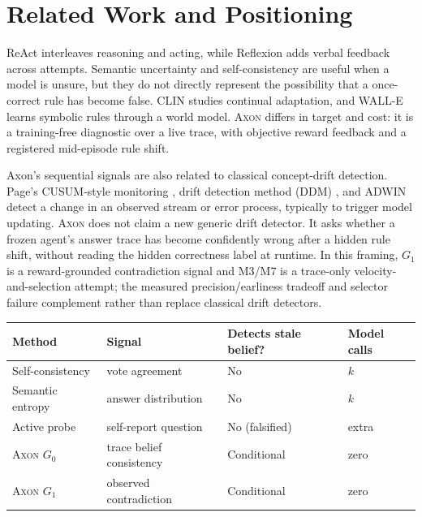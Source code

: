\documentclass[pdflatex,sn-basic]{sn-jnl}
\makeatletter
\theoremstyle{definition}
\newcommand{\axon}{\textsc{Axon}}
\def\tablebodyfont{\reset@font\fontsize{10.5bp}{12.5bp}\selectfont}
\renewenvironment{table}[1][]%
{\begin{tableorg}[#1]%
  \begin{center}%
  \begin{threeparttable}%
  \tablebodyfont%
  \setlength{\parskip}{0pt}%
  \renewcommand{\arraystretch}{1.20}%
  \renewcommand\footnotetext[2][]{{\removelastskip\vskip3pt%
    \let\tablebodyfont\tablefootnotefont%
    \hskip0pt\if!##1!\else{\smash{$^{##1}$}}\fi##2\par}}%
}{\end{threeparttable}\end{center}\end{tableorg}}
\makeatother
\begin{document}
\section{Related Work and Positioning}
\label{sec:related}

ReAct \citep{yao2023react} interleaves reasoning and acting, while Reflexion
\citep{shinn2023reflexion} adds verbal feedback across attempts. Semantic uncertainty and
self-consistency are useful when a model is unsure, but they do not directly represent the
possibility that a once-correct rule has become false. CLIN \citep{majumder2023clin} studies
continual adaptation, and WALL-E \citep{zhou2024walle} learns symbolic rules through a world
model. \axon{} differs in target and cost: it is a training-free diagnostic over a live trace,
with objective reward feedback and a registered mid-episode rule shift.

Axon's sequential signals are also related to classical concept-drift detection. Page's
CUSUM-style monitoring \citep{page1954}, drift detection method (DDM) \citep{gama2004}, and
ADWIN \citep{bifet2007} detect a change in an observed stream or error process, typically to
trigger model updating. \axon{} does not claim a new generic drift detector. It asks whether
a frozen agent's answer trace has become confidently wrong after a hidden rule shift, without
reading the hidden correctness label at runtime. In this framing, $G_1$ is a reward-grounded
contradiction signal and M3/M7 is a trace-only velocity-and-selection attempt; the measured
precision/earliness tradeoff and selector failure complement rather than replace classical
drift detectors.

\begin{table}[!ht]
\centering\footnotesize
\setlength{\tabcolsep}{3pt}
\begin{tabular}{p{24mm}p{30mm}p{39mm}p{15mm}}
\toprule
Method & Signal & Detects stale belief? & Model calls\\
\midrule
Self-consistency & vote agreement & No & $k$\\
Semantic entropy & answer distribution & No & $k$\\
Active probe & self-report question & No (falsified) & extra\\
\axon{} $G_0$ & trace belief consistency & Conditional & zero\\
\axon{} $G_1$ & observed contradiction & Conditional & zero\\
\bottomrule
\end{tabular}
\caption{Positioning of the evaluated signals. `No' means the signal does not detect the
confident-wrong regime in the tested setting; `Conditional' denotes a broad-shift condition
for $G_0$ and a reactive contradiction condition for $G_1$. The two gates are complementary,
not a solved selector.}
\label{tab:position}
\end{table}
\end{document}
